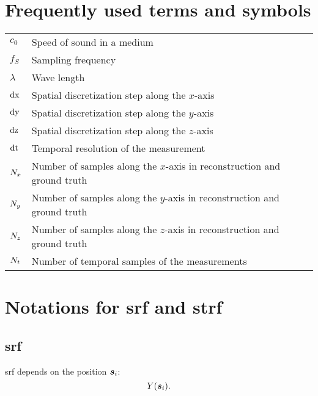 \section*{Frequently used terms and symbols}
\begin{flushleft}
\normalsize
\begin{tabular}{l l l}
$c_0$ & Speed of sound in a medium\\
$f_{S}$ & Sampling frequency \\
$\lambda$ &  Wave length\\
$\operatorname{dx}$  & Spatial discretization step along the $x$-axis\\
$\operatorname{dy}$  & Spatial discretization step along the $y$-axis\\
$\operatorname{dz}$  & Spatial discretization step along the $z$-axis \\
$\operatorname{dt}$  & Temporal resolution of the measurement\\
$N_{x}$  & Number of samples along the $x$-axis in reconstruction and ground truth\\
$N_{y}$  & Number of samples along the $y$-axis in reconstruction and ground truth\\
$N_{z}$  & Number of samples along the $z$-axis in reconstruction and ground truth\\
$N_{t}$  & Number of temporal samples of the measurements\\
\end{tabular}
\end{flushleft}


\section*{Notations for \acrshort*{srf} and \acrshort*{strf}}
\subsection*{ \acrfull{srf} }
\acrshort*{srf} depends on the position $\bm{s}_{ i }$:
\begin{equation*}
	Y (  \bm{s}_{ i }  ) .
\end{equation*}

